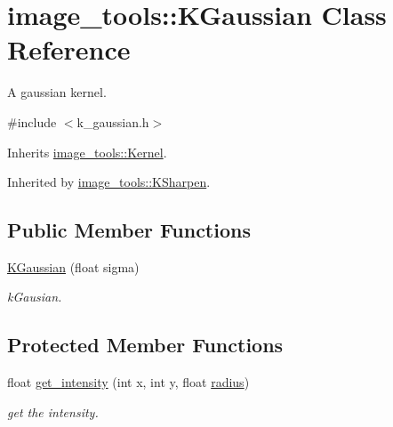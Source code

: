 \hypertarget{classimage__tools_1_1KGaussian}{}\section{image\+\_\+tools\+:\+:K\+Gaussian Class Reference}
\label{classimage__tools_1_1KGaussian}


A gaussian kernel.  




{\ttfamily \#include $<$k\+\_\+gaussian.\+h$>$}



Inherits \hyperlink{classimage__tools_1_1Kernel}{image\+\_\+tools\+::\+Kernel}.



Inherited by \hyperlink{classimage__tools_1_1KSharpen}{image\+\_\+tools\+::\+K\+Sharpen}.

\subsection*{Public Member Functions}
\begin{DoxyCompactItemize}
\item 
\hyperlink{classimage__tools_1_1KGaussian_af915a99f8a1e7bcc6331240844ce3842}{K\+Gaussian} (float sigma)\hypertarget{classimage__tools_1_1KGaussian_af915a99f8a1e7bcc6331240844ce3842}{}\label{classimage__tools_1_1KGaussian_af915a99f8a1e7bcc6331240844ce3842}

\begin{DoxyCompactList}\small\item\em k\+Gausian. \end{DoxyCompactList}\end{DoxyCompactItemize}
\subsection*{Protected Member Functions}
\begin{DoxyCompactItemize}
\item 
float \hyperlink{classimage__tools_1_1KGaussian_abf2ee77d07b4a34f52e15826edb969ce}{get\+\_\+intensity} (int x, int y, float \hyperlink{classimage__tools_1_1Kernel_ac834d16a242dd4a15f5f5e4a6dacea01}{radius})\hypertarget{classimage__tools_1_1KGaussian_abf2ee77d07b4a34f52e15826edb969ce}{}\label{classimage__tools_1_1KGaussian_abf2ee77d07b4a34f52e15826edb969ce}

\begin{DoxyCompactList}\small\item\em get the intensity. \end{DoxyCompactList}\end{DoxyCompactItemize}
